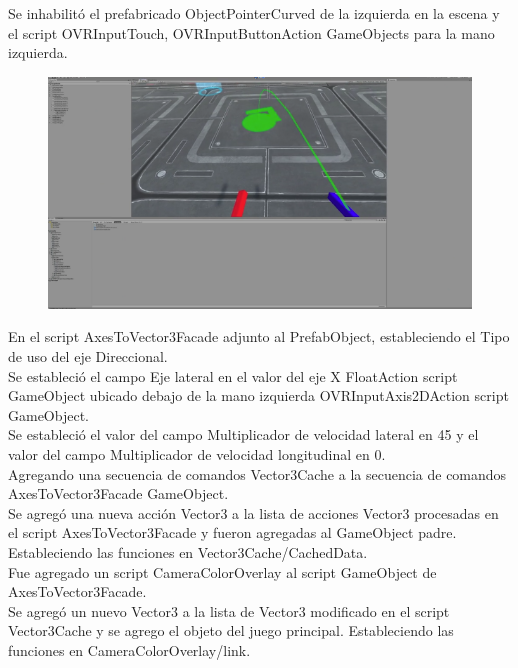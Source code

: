 Se inhabilitó el prefabricado ObjectPointerCurved de la izquierda en la escena y el script OVRInputTouch, OVRInputButtonAction GameObjects para la mano izquierda.\\
\begin{figure}[H]
	\begin{center}
 		\includegraphics[width = .5\textwidth]{source/images/image57.png}
	\end{center} 
\end{figure}

En el script AxesToVector3Facade adjunto al PrefabObject, estableciendo el Tipo de uso del eje Direccional.\\

Se  estableció el campo Eje lateral en el valor del eje X FloatAction script GameObject ubicado debajo de la mano izquierda OVRInputAxis2DAction script GameObject.\\

Se estableció el valor del campo Multiplicador de velocidad lateral en 45 y el valor del campo Multiplicador de velocidad longitudinal en 0.\\

Agregando una secuencia de comandos Vector3Cache a la secuencia de comandos AxesToVector3Facade GameObject.\\

Se agregó una nueva acción Vector3 a la lista de acciones Vector3 procesadas en el script AxesToVector3Facade y fueron agregadas al GameObject padre. Estableciendo las funciones en Vector3Cache/CachedData.\\

Fue agregado un script CameraColorOverlay al script GameObject de AxesToVector3Facade.\\

Se agregó un nuevo Vector3 a la lista de Vector3 modificado en el script Vector3Cache y  se agrego el objeto del juego principal. Estableciendo las funciones en CameraColorOverlay/link.\\

